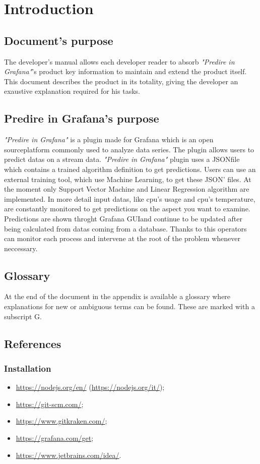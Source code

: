 \section{Introduction}
	\subsection{Document's purpose}
The developer's manual allows each developer reader to absorb \emph{"Predire in Grafana\glo"}'s product key information to maintain and extend the product itself.
This document describes the product in its totality, giving the developer an exaustive explanation required for his tasks.
	
\subsection{Predire in Grafana’s purpose}
\emph{"Predire in Grafana"} is a plugin made for Grafana which is an open source\glo platform commonly used to analyze data series. The plugin allows users to predict datas on a stream data. \emph{"Predire in Grafana"} plugin uses a JSON\glo file which contains a trained algorithm definition to get predictions. Users can use an external training tool, which use Machine Learning\glo , to get these JSON' files. At the moment only Support Vector Machine and Linear Regression algorithm are implemented. In more detail input datas, like cpu's usage and cpu's temperature, are constantly monitored to get predictions on the aspect you want to examine. Predictions are shown throght Grafana GUI\glo and continue to be updated after being calculated from datas coming from a database. Thanks to this operators can monitor each process and intervene at the root of the problem whenever neccessary.


\subsection{Glossary}
At the end of the document in the appendix is available a glossary where explanations for new or ambiguous terms can be found. These are marked with a subscript G.

\subsection{References}
\subsubsection{Installation}
\begin{itemize}
	\item \url{https://nodejs.org/en/} (\url{https://nodejs.org/it/});
	\item \url{https://git-scm.com/};
	\item \url{https://www.gitkraken.com/};
	\item \url{https://grafana.com/get};
	\item \url{https://www.jetbrains.com/idea/}.
\end{itemize}
